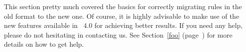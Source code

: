 This section pretty much covered the basics for correctly migrating rules in the old format to the new one. Of course, it is highly advisable to make use of the new features available in \arara\ 4.0 for achieving better results. If you need any help, please do not hesitating in contacting us. See Section~\ref{foo} (page~\pageref{foo}) for more details on how to get help.